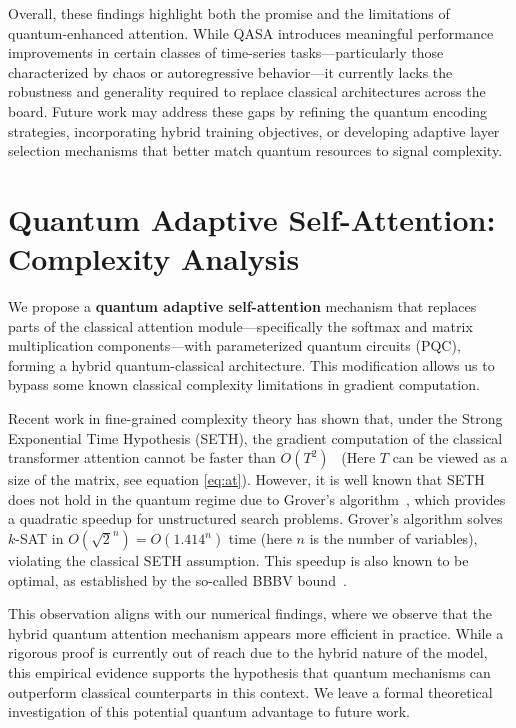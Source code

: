 \documentclass[conference]{IEEEtran}
\begin{document}
Overall, these findings highlight both the promise and the limitations of quantum-enhanced attention. While QASA introduces meaningful performance improvements in certain classes of time-series tasks—particularly those characterized by chaos or autoregressive behavior—it currently lacks the robustness and generality required to replace classical architectures across the board. Future work may address these gaps by refining the quantum encoding strategies, incorporating hybrid training objectives, or developing adaptive layer selection mechanisms that better match quantum resources to signal complexity.



\section{Quantum Adaptive Self-Attention: Complexity Analysis}

We propose a \textbf{quantum adaptive self-attention} mechanism that replaces parts of the classical attention module—specifically the softmax and matrix multiplication components—with parameterized quantum circuits (PQC), forming a hybrid quantum-classical architecture. This modification allows us to bypass some known classical complexity limitations in gradient computation.

Recent work in fine-grained complexity theory has shown that, under the Strong Exponential Time Hypothesis (SETH), the gradient computation of the classical transformer attention cannot be faster than \( O(T^2) \)~\cite{alman2024fine} (Here $T$ can be viewed as a size of the matrix, see equation \eqref{eq:at}). However, it is well known that SETH does not hold in the quantum regime due to Grover's algorithm~\cite{grover1996fast}, which provides a quadratic speedup for unstructured search problems. Grover's algorithm solves \( k \)-SAT in \( O(\sqrt{2}^n) = O(1.414^n) \) time (here $n$ is the number of variables), violating the classical SETH assumption. This speedup is also known to be optimal, as established by the so-called BBBV bound~\cite{bennett1997strengths}.

This observation aligns with our numerical findings, where we observe that the hybrid quantum attention mechanism appears more efficient in practice. While a rigorous proof is currently out of reach due to the hybrid nature of the model, this empirical evidence supports the hypothesis that quantum mechanisms can outperform classical counterparts in this context. We leave a formal theoretical investigation of this potential quantum advantage to future work.
\end{document}
